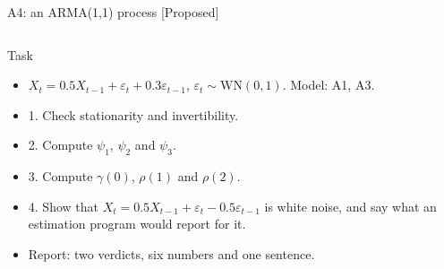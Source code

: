 \begin{frame}{A4: an ARMA(1,1) process [Proposed]}
\propsub
\itemsize{\scriptsize}
\begin{columns}[T]
\begin{column}{\taskw}
\begin{block}{Task}
\begin{itemize}
    \item $X_t = 0.5X_{t-1} + \varepsilon_t + 0.3\varepsilon_{t-1}$, $\varepsilon_t \sim \mathrm{WN}(0, 1)$. Model: A1, A3.
    \item 1. Check stationarity and invertibility.
    \item 2. Compute $\psi_1$, $\psi_2$ and $\psi_3$.
    \item 3. Compute $\gamma(0)$, $\rho(1)$ and $\rho(2)$.
    \item 4. Show that $X_t = 0.5X_{t-1} + \varepsilon_t - 0.5\varepsilon_{t-1}$ is white noise, and say what an estimation program would report for it.
    \item Report: two verdicts, six numbers and one sentence.
\end{itemize}
\end{block}
\end{column}
\begin{column}{\solw}
\end{column}
\end{columns}
\end{frame}

